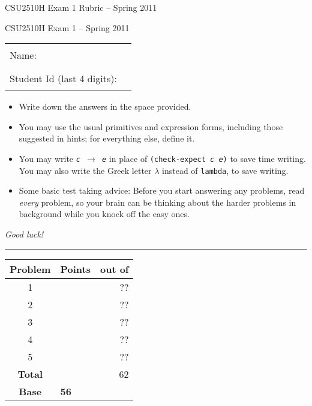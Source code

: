 \documentclass[12pt]{article}                   %
\newcommand\code[1]{\texttt{#1}}
\begin{document}
\vspace*{-1.5cm}
\ifrubric
\centerline{\Large CSU2510H Exam 1 Rubric -- Spring 2011}

\else
\centerline{\Large CSU2510H Exam 1 -- Spring 2011}

\vspace{0.5cm}

\begin{center}
\begin{tabular}{l@{\qquad}l}
Name:                        & \rule{174pt}{1pt} \\[.5cm]
Student Id (last 4 digits):  & \rule{174pt}{1pt} \\[.5cm]
\end{tabular}
\end{center}

\noindent\begin{minipage}{7cm}\sloppy
\begin{itemize}
\item Write down the answers in the space provided.

\item You may use the usual primitives and expression forms, including those
suggested in hints; for everything else, define it.

\item You may write {\tt {\slshape c} $\rightarrow$ {\slshape e}} in place of
  {\tt (check-expect {\slshape c e})} to save time writing. 
  You may also write the Greek letter $\lambda$ 
  instead of \code{lambda}, to save writing.


\item Some basic test taking advice: Before you start answering
any problems, read \emph{every} problem, so your brain can be thinking
about the harder problems in background while you knock off the easy ones.
\end{itemize}

\bigskip

\emph{Good luck!}
\end{minipage}\hfil\begin{minipage}[t]{6cm}
\rule{1cm}{0pt}\begin{tabular}{|c|l|@{/}r|}
\hline
{\bf Problem} & Points & out of \\ \hline
1 & & ??\\ \hline
2 & & ??\\ \hline
3 & & ??\\ \hline
4 & & ??\\ \hline
5 & & ??\\ \hline
{\bf Total} & & 62 \\ \hline
{\bf Base}  & \multicolumn{2}{l|}{{\bf 56}} \\ \hline
\end{tabular}
\end{minipage}
\end{document}
